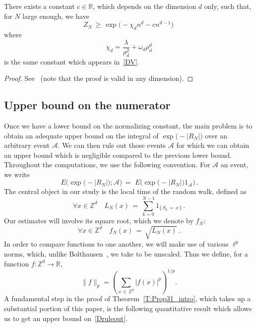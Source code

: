\documentclass[10pt]{amsart}
\theoremstyle{definition}\newtheorem{defi}[theo]{Definition}\newtheorem{rema}[theo]{Remark}\newtheorem{exam}[theo]{Example}\newtheorem{exem}[theo]{Example}\newtheorem{nota}[theo]{Notation}
\newcommand*\Z {{\mathbb Z}}
\newcommand*\Zd {{\mathbb Z^d}}
\newcommand*\R{\mathbb{R}}
\newcommand{\cA}{\mathcal{A}}
\let\oldforall\forall
\renewcommand*{\forall}{\mathrel{\oldforall}}
\begin{document}
\begin{prop}\label{P:lbZ}
There exists a constant $c \in \R$, which depends on the dimension $d$ only, such that, for $N$ large enough, we have
\[
Z_N\,\geq\,\exp\Big(-\chi_d n^{{d}}-cn^{{d-1}}\Big)\,
\]
where
\[
\chi_d = \frac{\lambda}{\rho_d^2} + \omega_d \rho_d^d
\]
is the same constant which appears in~\eqref{DV}.
\end{prop}



\begin{proof}
See~\cite[Proposition~2.1]{BO} (note that the proof is valid in any dimension).
\end{proof}



\subsection{Upper bound on the numerator} Once we have a lower bound on the normalizing constant, the main problem is to obtain an adequate upper bound on the integral of $\exp\big(-|R_N|\big)$ over an arbitrary event $\cA$. We can then rule out those events $\cA$ for which we can obtain an upper bound which is negligible compared to the previous lower bound. Throughout the computations, we use the following convention. For $\cA$ an event, we write
\begin{equation}\label{Druleout}
\,E\Big(\exp\big(-|R_N|\big); \cA\Big)\,=\,
\,E\Big(\exp\big(-|R_N|\big)1_\cA\Big)
\,.
\end{equation}
The central object in our study is the local time of the random walk, defined as
\begin{equation}\label{D:localtimes}
\forall x\in\Zd\quad L_N(x)\,=\,
\sum_{k=0}^{N-1}1_{\{\,S_k\,=\,x\,\}}\,.
\end{equation}
Our estimates will involve its square root, which we denote by $f_N$:
\begin{equation}\label{D:fN}
\forall x\in\Zd\quad f_N(x)\,=\,\sqrt{L_N(x)}\,.
\end{equation}
In order to compare functions to one another, we will make use of various $\ell^p$ norms, which, unlike Bolthausen~\cite{BO}, we take to be unscaled. Thus we define, for a function $f : \Z^d \to \R$,
\begin{equation}\label{D:lp}
\|f \|_p = \left(\sum_{x\,\in\,\Z^d} | f(x)|^p \right)^{1/p}.
\end{equation}
A fundamental step in the proof of Theorem~\ref{T:Prop31_intro}, which takes up a substantial portion of this paper, is the following quantitative result which allows us to get an upper bound on~\eqref{Druleout}.
\end{document}
